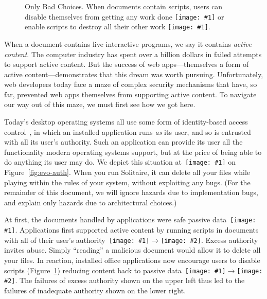 \documentclass[letterpaper,twocolumn,10pt]{article}
\newcommand{\q}[1]{{\texttt{[image: \#1]}}}
\newcommand{\qq}[2]{{\texttt{[image: \#1]}}$\rightarrow${\texttt{[image: \#2]}}}
\begin{document}
\begin{figure}[t!]
\caption[Only Bad Choices.]{Only Bad Choices. When documents contain scripts, 
users can disable themselves from getting any work done \q{1} or enable 
scripts to destroy all their other work \q{2}.}
  \label{fig:dialog}
\end{figure}

When a document contains live interactive programs, we say it contains 
\emph{active content}. The computer industry has spent over a billion dollars 
in failed attempts to support active content. But the success of web 
apps---themselves a form of active content---demonstrates that this dream was 
worth pursuing. Unfortunately, web developers today face a maze of complex 
security mechanisms that have, so far, prevented web apps themselves from 
supporting active content. To navigate our way out of this maze, we must 
first see how we got here.

Today's desktop operating systems all use some form of identity-based access 
control~\cite{karp:abac-soa}, in which an installed application runs 
\emph{as} its user, and so is entrusted with all its user's authority. Such 
an application can provide its user all the functionality modern operating 
systems support, but at the price of being able to do anything its user may 
do. We depict this situation at~\q{2} on Figure~\ref{fig:evo-auth}. When you 
run Solitaire, it can delete all your files while playing within the rules of 
your system, without exploiting any bugs. (For the remainder of this document, 
we will ignore hazards due to implementation bugs, and explain only hazards 
due to architectural choices.)

At first, the documents handled by applications were safe passive data~\q{1}. 
Applications first supported active content by running scripts in documents 
with all of their user's authority~\qq{1}{2}. Excess authority invites abuse. 
Simply ``reading'' a malicious document would allow it to delete all your 
files. In reaction, installed office applications now encourage users to 
disable scripts (Figure~\ref{fig:dialog}) reducing content back to passive 
data~\qq{2}{1}. The failures of excess authority shown on the upper left thus 
led to the failures of inadequate authority shown on the lower right.
\end{document}
